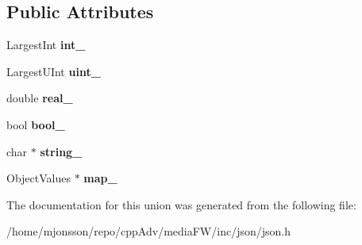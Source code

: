 \subsection*{Public Attributes}
\begin{DoxyCompactItemize}
\item 
\mbox{\label{unionJson_1_1Value_1_1ValueHolder_adbfb384301298844ed955ba5cf6015a0}} 
Largest\+Int {\bfseries int\+\_\+}
\item 
\mbox{\label{unionJson_1_1Value_1_1ValueHolder_aab65665dc15a24a29a8e93cdeeaa7e50}} 
Largest\+U\+Int {\bfseries uint\+\_\+}
\item 
\mbox{\label{unionJson_1_1Value_1_1ValueHolder_af0c5ca724e5fe3a15db773d750e2351e}} 
double {\bfseries real\+\_\+}
\item 
\mbox{\label{unionJson_1_1Value_1_1ValueHolder_a92edab1861dadbfefd8be5fd4285eefe}} 
bool {\bfseries bool\+\_\+}
\item 
\mbox{\label{unionJson_1_1Value_1_1ValueHolder_a70ac2b153bc405527baa3850d2ddc3cb}} 
char $\ast$ {\bfseries string\+\_\+}
\item 
\mbox{\label{unionJson_1_1Value_1_1ValueHolder_a1e7a5b86d4f52234f55c847ad1ce389a}} 
Object\+Values $\ast$ {\bfseries map\+\_\+}
\end{DoxyCompactItemize}


The documentation for this union was generated from the following file\+:\begin{DoxyCompactItemize}
\item 
/home/mjonsson/repo/cpp\+Adv/media\+F\+W/inc/json/json.\+h\end{DoxyCompactItemize}

